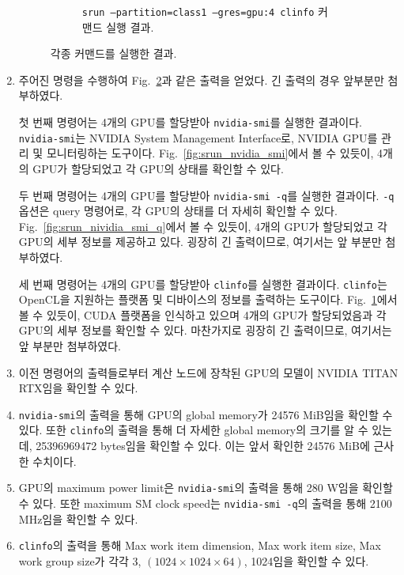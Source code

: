 \begin{enumerate}[label= (\alph*)]
\begin{figure}[t]
\begin{subfigure}[b]{\textwidth}
            \caption{
                \texttt{srun --partition=class1 --gres=gpu:4 clinfo} 커맨드 실행 결과.
            }\label{fig:srun_clinfo}
        \end{subfigure}
        \caption{각종 커맨드를 실행한 결과.}\label{fig:srun}
    \end{figure}

    \item {
        주어진 명령을 수행하여 Fig.~\ref{fig:srun}과 같은 출력을 얻었다. 긴 출력의 경우 앞부분만 첨부하였다.

        첫 번째 명령어는 4개의 GPU를 할당받아 \texttt{nvidia-smi}를 실행한 결과이다.
        \texttt{nvidia-smi}는 NVIDIA System Management Interface로, NVIDIA GPU를 관리 및 모니터링하는 도구이다.
        Fig.~\ref{fig:srun_nvidia_smi}에서 볼 수 있듯이, 4개의 GPU가 할당되었고 각 GPU의 상태를 확인할 수 있다.

        두 번째 명령어는 4개의 GPU를 할당받아 \texttt{nvidia-smi -q}를 실행한 결과이다.
        \texttt{-q} 옵션은 query 명령어로, 각 GPU의 상태를 더 자세히 확인할 수 있다.
        Fig.~\ref{fig:srun_nividia_smi_q}에서 볼 수 있듯이, 4개의 GPU가 할당되었고
        각 GPU의 세부 정보를 제공하고 있다. 굉장히 긴 출력이므로, 여기서는 앞 부분만 첨부하였다.

        세 번째 명령어는 4개의 GPU를 할당받아 \texttt{clinfo}를 실행한 결과이다.
        \texttt{clinfo}는 OpenCL을 지원하는 플랫폼 및 디바이스의 정보를 출력하는 도구이다.
        Fig.~\ref{fig:srun_clinfo}에서 볼 수 있듯이, CUDA 플랫폼을 인식하고 있으며
        4개의 GPU가 할당되었음과 각 GPU의 세부 정보를 확인할 수 있다.
        마찬가지로 굉장히 긴 출력이므로, 여기서는 앞 부분만 첨부하였다.
    }

    \item {
        이전 명령어의 출력들로부터 계산 노드에 장착된 GPU의 모델이 NVIDIA TITAN RTX임을 확인할 수 있다.
    }

    \item {
        \texttt{nvidia-smi}의 출력을 통해 GPU의 global memory가 24576 MiB임을 확인할 수 있다.
        또한 \texttt{clinfo}의 출력을 통해 더 자세한 global memory의 크기를 알 수 있는데,
        25396969472 bytes임을 확인할 수 있다. 이는 앞서 확인한 24576 MiB에 근사한 수치이다.
    }

    \item {
        GPU의 maximum power limit은 \texttt{nvidia-smi}의 출력을 통해 280 W임을 확인할 수 있다.
        또한 maximum SM clock speed는 \texttt{nvidia-smi -q}의 출력을 통해 2100 MHz임을 확인할 수 있다.
    }

    \item {
        \texttt{clinfo}의 출력을 통해 Max work item dimension, Max work item size, Max work group size가
        각각 3, $(1024\times1024\times64)$, 1024임을 확인할 수 있다.
    }

\end{enumerate}
